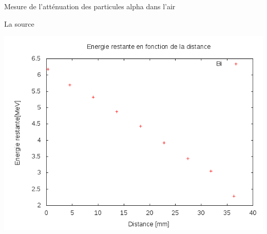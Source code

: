 \documentclass[a4paper,11pt]{scrartcl}
\begin{document}
\begin{section}{Mesure de l'atténuation des particules alpha dans l'air}
\begin{subsection}{La source }
\begin{minipage}{0.45\textwidth}
    \end{minipage}
    \hfill
    \begin{minipage}{0.45\textwidth}
     \includegraphics[width=\textwidth]{Sabine/bi_distance.png}
    \end{minipage}
   \end{subsection}
  

\end{section}
\end{document}
